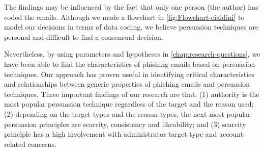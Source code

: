 The findings may be influenced by the fact that only one person (the
author) has coded the emails. Although we made a flowchart in \autoref{fig:Flowchart-cialdini}
to model our decisions in terms of data coding, we believe persuasion
techniques are personal and difficult to find a consensual decision.

Nevertheless, by using parameters and hypotheses in \autoref{chap:research-questions},
we have been able to find the characteristics of phishing emails based
on persuasion techniques. Our approach has proven useful in identifying
critical characteristics and relationships between generic properties
of phishing emails and persuasion techniques. Three important findings
of our research are that: (1) authority is the most popular persuasion
technique regardless of the target and the reason used; (2) depending
on the target types and the reason types, the next most popular persuasion
principles are scarcity, consistency and likeability; and (3) scarcity
principle has a high involvement with administrator target type and
account-related concerns. 


